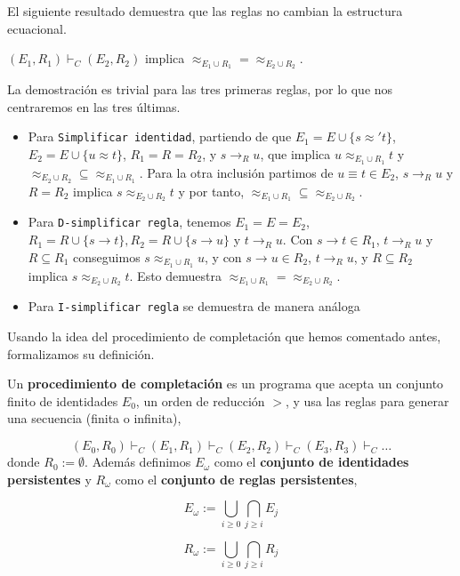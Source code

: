 El siguiente resultado demuestra que las reglas no cambian la
estructura ecuacional.

\begin{lema}
  $(E_1,R_1) \vdash_C (E_2,R_2)$ implica
  $\approx_{E_1 \cup R_1} = \approx_{E_2 \cup R_2}$.
\end{lema}

\begin{demo}
  La demostración es trivial para las tres primeras reglas, por lo que
  nos centraremos en las tres últimas.
  \begin{itemize}
  \item Para \texttt{Simplificar identidad}, partiendo de que
    $E_1 = E \cup \{s \approx' t\}$, $E_2 = E \cup \{ u \approx t \}$,
    $R_1 = R = R_2$, y $s \rightarrow_R u$, que implica
    $u \approx_{E_1 \cup R_1} t$ y
    $\approx_{E_2 \cup R_2} \subseteq \approx_{E_1 \cup R_1}$. Para la
    otra inclusión partimos de $u \equiv t \in E_2$,
    $s \rightarrow_R u$ y $R = R_2$ implica
    $s \approx_{E_2 \cup R_2} t$ y por tanto,
    $\approx_{E_1 \cup R_1} \subseteq \approx_{E_2 \cup R_2}$.
  \item Para \texttt{D-simplificar regla}, tenemos $E_1 = E = E_2$,
    $R_1 = R \cup \{s \rightarrow t \}, R_2 = R \cup \{s \rightarrow
    u\}$ y $t \rightarrow_R u$. Con $s \rightarrow t \in R_1$,
    $t \rightarrow_R u$ y $R \subseteq R_1$ conseguimos
    $s \approx_{E_1 \cup R_1} u$, y con $s \rightarrow u \in R_2$,
    $t \rightarrow_R u$, y $R \subseteq R_2$ implica
    $s \approx_{E_2 \cup R_2} t$. Esto demuestra
    $\approx_{E_1 \cup R_1} = \approx_{E_2 \cup R_2}$.
  \item Para \texttt{I-simplificar regla} se demuestra de manera análoga
\end{itemize}
\end{demo}

Usando la idea del procedimiento de completación que hemos comentado
antes, formalizamos su definición.

\begin{defi}
  Un \textbf{procedimiento de completación} es un programa que acepta un
  conjunto finito de identidades $E_0$, un orden de reducción $>$, y
  usa las reglas para generar una secuencia (finita o infinita),

  \[
    (E_0,R_0) \vdash_C (E_1,R_1) \vdash_C (E_2,R_2) \vdash_C (E_3,
    R_3) \vdash_C \dots
  \]
  donde $R_0 := \emptyset$.  Además definimos $E_\omega$ como el
  \textbf{conjunto de identidades persistentes} y $R_\omega$ como el \textbf{conjunto
  de reglas persistentes},

  \[
    E_\omega := \bigcup_{i \geq 0} \bigcap_{j \geq i} E_j
  \]

  \[
R_\omega :=  \bigcup_{i \geq 0} \bigcap_{j \geq i} R_j
  \]
  
\end{defi}

